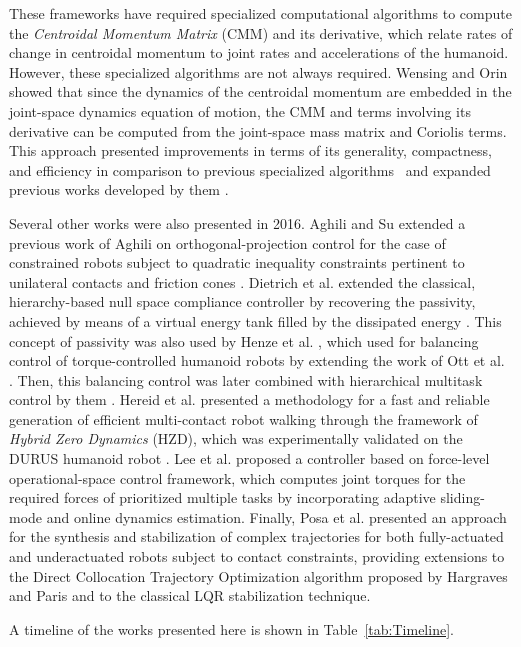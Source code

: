 	These frameworks have required specialized computational algorithms to compute the
	\emph{Centroidal Momentum Matrix} (CMM) and its derivative, which relate rates of change in
	centroidal momentum to joint rates and accelerations of the humanoid.
	However, these specialized algorithms are not always required.
	Wensing and Orin \cite{Wensing_IJHR2016} showed that since the dynamics of the centroidal momentum
	are embedded in the joint-space dynamics equation of motion, the CMM and terms involving its
	derivative can be computed from the joint-space mass matrix and Coriolis terms.
	This approach presented improvements in terms of its generality, compactness, and efficiency in
	comparison to previous specialized algorithms~\cite{Wensing_IJHR2016} and expanded previous
	works developed by them \cite{Wensing_ICRA2013} \cite{Wensing_IJHR2013}.
	
	Several other works were also presented in 2016.
	Aghili and Su \cite{Aghili_ICRA2016} extended a previous work of Aghili \cite{Aghili_TransRobotics2005}
	on orthogonal-projection control for the case of constrained robots subject to quadratic inequality
	constraints pertinent to unilateral contacts and friction cones \cite{Aghili_ICRA2016}.
	Dietrich et al. \cite{Dietrich_ICRA2016} extended the classical, hierarchy-based null space compliance
	controller by recovering the passivity, achieved by means of a virtual energy tank filled by the
	dissipated energy \cite{Dietrich_ICRA2016}.
	This concept of passivity was also used by Henze et al. \cite{Henze_IJRR2016}, which used for balancing
	control of torque-controlled humanoid robots by extending the work of Ott et al. \cite{Ott_Humanoids2011}.
	Then, this balancing control was later combined with hierarchical multitask control by them
	\cite{Henze_ICRA2016}.
	Hereid et al. \cite{Hereid_ICRA2016} presented a methodology for a fast and reliable generation of efficient
	multi-contact robot walking through the framework of \emph{Hybrid Zero Dynamics} (HZD), which was
	experimentally validated on the DURUS humanoid robot \cite{Hereid_ICRA2016}.
	Lee et al. \cite{LeeJ_ICRA2016} proposed a controller based on force-level operational-space control
	framework, which computes joint torques for the required forces of prioritized multiple tasks by
	incorporating adaptive sliding-mode and online dynamics estimation.
	Finally, Posa et al. \cite{Posa_ICRA2016} presented an approach for the synthesis and stabilization of
	complex trajectories for both fully-actuated and underactuated robots subject to contact constraints,
	providing extensions to the Direct Collocation Trajectory Optimization algorithm proposed by Hargraves
	and Paris \cite{Hargraves_GuidControlDyn1987} and to the classical LQR stabilization technique.
	
	A timeline of the works presented here is shown in Table~\ref{tab:Timeline}.
	
	
